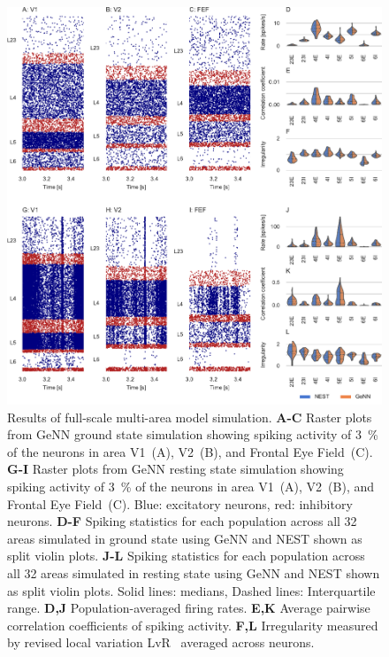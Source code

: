 \documentclass[9pt,a4paper]{amsart}
\newenvironment{fullwidth}{%
  \begin{adjustwidth}{-0.85in}{-0.85in}
}{\end{adjustwidth}}
\begin{document}
\begin{figure}
    \begin{fullwidth}
        \centering
        \includegraphics{figures/multi_area}
        \captionsetup{width=6.69in}
        \caption{Results of full-scale multi-area model simulation. 
        \textbf{A-C} Raster plots from GeNN ground state simulation showing spiking activity of \SI{3}{\percent} of the neurons in area V1~(A), V2~(B), and Frontal Eye Field~(C).
        \textbf{G-I} Raster plots from GeNN resting state simulation showing spiking activity of \SI{3}{\percent} of the neurons in area V1~(A), V2~(B), and Frontal Eye Field~(C).
        Blue: excitatory neurons, red: inhibitory neurons.
        \textbf{D-F} Spiking statistics for each population across all 32 areas simulated in ground state using GeNN and NEST shown as split violin plots.
        \textbf{J-L} Spiking statistics for each population across all 32 areas simulated in resting state using GeNN and NEST shown as split violin plots.
        Solid lines: medians, Dashed lines: Interquartile range.
        \textbf{D,J} Population-averaged firing rates.
        \textbf{E,K} Average pairwise correlation coefficients of spiking activity. 
        \textbf{F,L} Irregularity measured by revised local variation LvR~\citep{Shinomoto2009} averaged across neurons.}
        \label{fig:multi_area}
    \end{fullwidth}
\end{figure}
\end{document}
